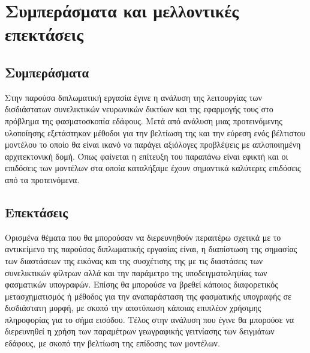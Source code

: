 \chapter{Συμπεράσματα και μελλοντικές επεκτάσεις}
\label{ch:conclusions}
\section{Συμπεράσματα}
Στην παρούσα διπλωματική εργασία έγινε η ανάλυση της λειτουργίας των δισδιάστατων συνελικτικών νευρωνικών δικτύων και της εφαρμογής τους στο πρόβλημα της φασματοσκοπία εδάφους. Μετά από ανάλυση μιας προτεινόμενης υλοποίησης εξετάστηκαν μέθοδοι για την βελτίωση της και την εύρεση ενός βέλτιστου μοντέλου το οποίο θα είναι ικανό να παράγει αξιόλογες προβλέψεις με απλοποιημένη αρχιτεκτονική δομή. Όπως φαίνεται η επίτευξη του παραπάνω είναι εφικτή και οι επιδόσεις των μοντέλων στα οποία καταλήξαμε έχουν σημαντικά καλύτερες επιδόσεις από τα προτεινόμενα.

\section{Επεκτάσεις}
Ορισμένα θέματα που θα μπορούσαν να διερευνηθούν περαιτέρω σχετικά με το αντικείμενο της παρούσας διπλωματικής εργασίας είναι, η διαπίστωση της σημασίας των διαστάσεων της εικόνας και της συσχέτισης της με τις διαστάσεις των συνελικτικών φίλτρων αλλά και την παράμετρο της υποδειγματοληψίας των φασματικών υπογραφών. Επίσης θα μπορούσε να βρεθεί κάποιος διαφορετικός μετασχηματισμός ή μέθοδος για την αναπαράσταση της φασματικής υπογραφής σε δισδιάστατη μορφή, με σκοπό την αποτύπωση κάποιας επιπλέον χρήσιμης πληροφορίας για το σήμα εισόδου. Τέλος στην ανάλυση που έγινε θα μπορούσε να διερευνηθεί η χρήση των παραμέτρων γεωγραφικής γειτνίασης των δειγμάτων εδάφους, με σκοπό την βελτίωση της επίδοσης των μοντέλων.
